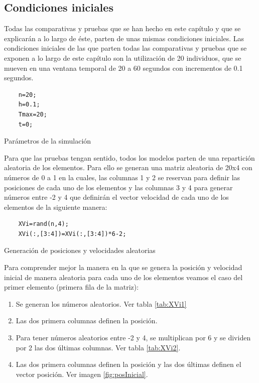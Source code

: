 \subsection{Condiciones iniciales}\label{s4_2_1}
Todas las comparativas y pruebas que se han hecho en este capítulo y que se explicarán a lo largo de éste, parten de unas mismas condiciones iniciales. 
Las condiciones iniciales de las que parten todas las comparativas y pruebas que se exponen a lo largo de este capítulo son la utilización de 20 individuos, que se mueven en una ventana temporal de 20 a 60 segundos con incrementos de 0.1 segundos.

\begin{listing}[!ht]
\begin{verbatim}
    n=20;
    h=0.1;
    Tmax=20; 
    t=0;
\end{verbatim}
\caption{Parámetros de la simulación}
\end{listing}

Para que las pruebas tengan sentido, todos los modelos parten de una repartición aleatoria de los elementos. Para ello se generan una matriz aleatoria de 20x4 con números de 0 a 1 en la cuales, las columnas 1 y 2 se reservan para definir las posiciones de cada uno de los elementos y las columnas 3 y 4 para generar números entre -2 y 4 que definirán el vector velocidad de cada uno de los elementos de la siguiente manera:

\begin{listing}[!ht]
\begin{verbatim}
    XVi=rand(n,4);
    XVi(:,[3:4])=XVi(:,[3:4])*6-2;
\end{verbatim}
\caption{Generación de posiciones y velocidades aleatorias}
\end{listing}

Para comprender mejor la manera en la que se genera la posición y velocidad inicial de manera aleatoria para cada uno de los elementos veamos el caso del primer elemento (primera fila de la matriz):

\begin{enumerate}
    \item Se generan los números aleatorios. Ver tabla \ref{tab:XVi1}
    \item Las dos primera columnas definen la posición.
    \item Para tener números aleatorios entre -2 y 4, se multiplican por 6 y se dividen por 2 las dos últimas columnas. Ver tabla \ref{tab:XVi2}.
    \item Las dos primera columnas definen la posición y las dos últimas definen el vector posición. Ver imagen \ref{fig:posInicial}.
\end{enumerate}

